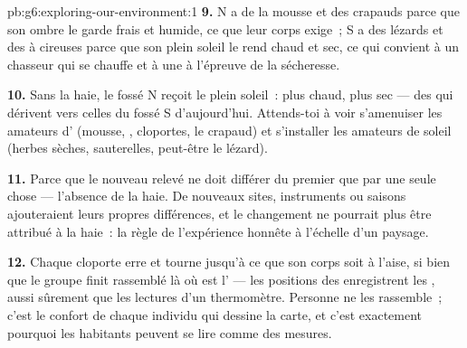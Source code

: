\begin{solution}{pb:g6:exploring-our-environment:1}
\textbf{9.} N a de la mousse et des crapauds parce que son ombre le
garde frais et humide, ce que leur corps exige~; S a des lézards et
des  à  cireuses parce que son plein soleil le rend
chaud et sec, ce qui convient à un chasseur qui se chauffe et à une
 à l'épreuve de la sécheresse.

\textbf{10.} Sans la haie, le fossé N reçoit le plein soleil~: plus
chaud, plus sec --- des  qui dérivent vers celles du fossé
S d'aujourd'hui. Attends-toi à voir s'amenuiser les amateurs
d' (mousse, , cloportes, le crapaud) et s'installer
les amateurs de soleil (herbes sèches, sauterelles, peut-être le
lézard).

\textbf{11.} Parce que le nouveau relevé ne doit différer du premier
que par une seule chose --- l'absence de la haie. De nouveaux sites,
instruments ou saisons ajouteraient leurs propres différences, et le
changement ne pourrait plus être attribué à la haie~: la règle de
l'expérience honnête à l'échelle d'un paysage.

\textbf{12.} Chaque cloporte erre et tourne jusqu'à ce que son corps
soit à l'aise, si bien que le groupe finit rassemblé là où est
l' --- les positions des  enregistrent les
, aussi sûrement que les lectures d'un thermomètre.
Personne ne les rassemble~; c'est le confort de chaque individu qui
dessine la carte, et c'est exactement pourquoi les habitants
peuvent se lire comme des mesures.
\end{solution}
